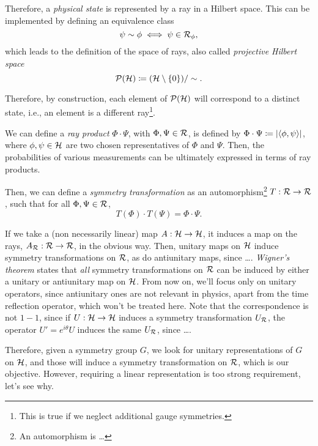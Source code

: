 Therefore, a \emph{physical state} is represented by a ray in a Hilbert space. This can be implemented by defining an equivalence class
\begin{equation}
    \psi \sim \phi \iff \psi \in \mathcal{R}_\phi ,
\end{equation}
which leads to the definition of the space of rays, also called \emph{projective Hilbert space}
\begin{equation}
    \mathcal{P}(\mathcal{H}) \coloneq (\mathcal{H} \setminus \{0\}) / \sim .
\end{equation}

Therefore, by construction, each element of $\mathcal{P}(\mathcal{H})$ will correspond to a distinct state, i.e., an element is a different ray\footnote{This is true if we neglect additional gauge symmetries.}.

We can define a \emph{ray product} $\Phi \cdot \Psi$, with $\Phi,\Psi \in \mathcal{R}$, is defined by $\Phi \cdot \Psi \coloneq \abs{\langle \phi, \psi \rangle}$, where $\phi,\psi \in \mathcal{H}$ are two chosen representatives of $\Phi$ and $\Psi$. Then, the probabilities of various measurements can be ultimately expressed in terms of ray products.

Then, we can define a \emph{symmetry transformation} as an automorphism\footnote{An automorphism is \dots} $T: \mathcal{R} \to \mathcal{R}$, such that for all $\Phi,\Psi \in \mathcal{R}$,
\begin{equation}
    T(\Phi) \cdot T(\Psi) = \Phi \cdot \Psi .
\end{equation}

If we take a (non necessarily linear) map $A: \mathcal{H} \to \mathcal{H}$, it induces a map on the rays, $A_{\mathcal{R}}: \mathcal{R} \to \mathcal{R}$, in the obvious way. Then, unitary maps on $\mathcal{H}$ induce symmetry transformations on $\mathcal{R}$, as do antiunitary maps, since \dots. \emph{Wigner's theorem} states that \emph{all} symmetry transformations on $\mathcal{R}$ can be induced by either a unitary or antiunitary map on $\mathcal{H}$. From now on, we'll focus only on unitary operators, since antiunitary ones are not relevant in physics, apart from the time reflection operator, which won't be treated here. Note that the correspondence is not $1-1$, since if $U: \mathcal{H} \to \mathcal{H}$ induces a symmetry transformation $U_{\mathcal{R}}$, the operator $U' = e^{i\theta}U$ induces the same $U_{\mathcal{R}}$, since \dots.

Therefore, given a symmetry group $G$, we look for unitary representations of $G$ on $\mathcal{H}$, and those will induce a symmetry transformation on $\mathcal{R}$, which is our objective. However, requiring a linear representation is too strong requirement, let's see why.

